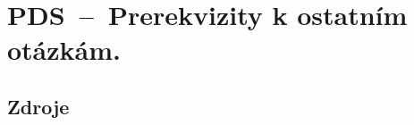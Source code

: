 

\graphicspath{{pds/prerekvizity/figures}}


\chapter{PDS~--~Prerekvizity k ostatním otázkám.}





\section{Zdroje}

